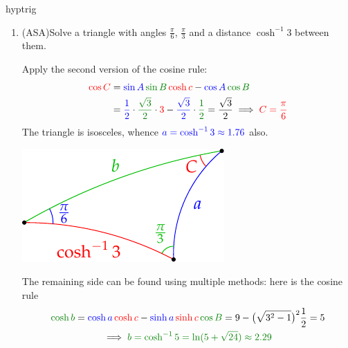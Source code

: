 \begin{examples}{}{hyptrig}
\begin{enumerate}
	  \item (ASA)\lstsp Solve a triangle with angles $\frac\pi 6$, $\frac\pi 3$ and a distance $\cosh^{-1}3$ between them.\par
	  \begin{minipage}[t]{0.65\linewidth}\vspace{-5pt}
	  	Apply the second version of the cosine rule:
	  	\begin{align*}
	  		\textcolor{red}{\cos C}& =\textcolor{blue}{\sin A} \, \textcolor{Green}{\sin B} \, \textcolor{red}{\cosh c}-\textcolor{blue}{\cos A} \, \textcolor{Green}{\cos B}\\
	  		&=\textcolor{blue}{\frac 12} \cdot \textcolor{Green}{\frac{\sqrt 3}2} \cdot \textcolor{red}{3} - \textcolor{blue}{\frac{\sqrt 3}2} \cdot \textcolor{Green}{\frac 12} =\frac{\sqrt 3}2 \implies\textcolor{red}{C=\frac\pi 6}
	  	\end{align*}
	  	The triangle is isosceles, whence $\textcolor{blue}{a=\cosh^{-1}3\approx 1.76}$ also.
	  \end{minipage}
	  \hfill
	  \begin{minipage}[t]{0.34\linewidth}\vspace{-8pt}
	  	\flushright\includegraphics{isom-trigasa}
	  \end{minipage}\par
	  The remaining side can be found using multiple methods: here is the cosine rule
	  \begin{gather*}
	  	\textcolor{Green}{\cosh b}=\textcolor{blue}{\cosh a} \, \textcolor{red}{\cosh c} - \textcolor{blue}{\sinh a} \, \textcolor{red}{\sinh c} \, \textcolor{Green}{\cos B} =9-\bigl(\sqrt{3^2-1}\bigr)^2\frac 12 =5\\
	  	\implies \textcolor{Green}{b=\cosh^{-1}5=\ln(5+\sqrt{24})\approx 2.29}
	  \end{gather*}
	  
	\end{enumerate}
\end{examples}





